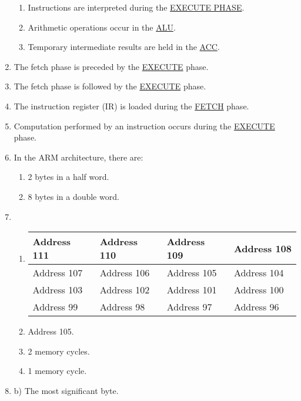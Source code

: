 \documentclass{article}
\begin{document}
\begin{enumerate}
\begin{enumerate}
                \item   Instructions are interpreted during the \underline{EXECUTE PHASE}.
                \item   Arithmetic operations occur in the \underline{ALU}.
                \item   Temporary intermediate results are held in the \underline{ACC}.
            \end{enumerate}
	\item   The fetch phase is preceded by the \underline{EXECUTE} phase.
	\item   The fetch phase is followed by the \underline{EXECUTE} phase.
	\item   The instruction register (IR) is loaded during the \underline{FETCH} phase.
	\item   Computation performed by an instruction occurs during the \underline{EXECUTE} phase.
	\item   In the ARM architecture, there are:
        \begin{enumerate}
            \item 2 bytes in a half word.
            \item 8 bytes in a double word.
        \end{enumerate}
    \pagebreak
    \setcounter{enumi}{11}
	\item   
        \begin{enumerate}
            \item
                \begin{tabular}{ p{2cm} | p{2cm} | p{2cm} | p{2cm} }   
                    \hline
                    Address 111 & Address 110 & Address 109 & Address 108   \\ \hline
                    Address 107 & Address 106 & \cellcolor{gray}Address 105 & \cellcolor{gray}Address 104   \\ \hline
                    \cellcolor{gray}Address 103 & \cellcolor{gray}Address 102 & Address 101 & Address 100   \\ \hline
                    Address 99  & Address 98  & Address 97  & Address 96    \\ \hline
                \end{tabular}
             \item  Address 105.
             \item  2 memory cycles.
             \item  1 memory cycle.
         \end{enumerate}
     \item  b) The most significant byte.

\end{enumerate}
\end{document}

